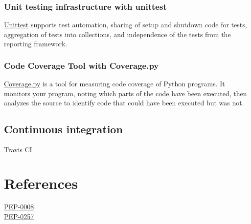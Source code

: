 \documentclass[a4paper]{report}
\begin{document}


\subsection{Unit testing infrastructure with unittest}
\href{https://docs.python.org/3/library/unittest.html}{Unittest} supports test automation, sharing of setup and shutdown code for tests, aggregation of tests into collections, and independence of the tests from the reporting framework.




\subsection{Code Coverage Tool with Coverage.py}
\href{http://coverage.readthedocs.io/en/latest/}{Coverage.py} is a tool for measuring code coverage of Python programs. It monitors your program, noting which parts of the code have been executed, then analyzes the source to identify code that could have been executed but was not.



\section{Continuous integration}
Travis CI


\chapter*{References}
\href{https://www.python.org/dev/peps/pep-0008/}{PEP-0008}\\
\href{https://www.python.org/dev/peps/pep-0257/}{PEP-0257}

	
\end{document}

